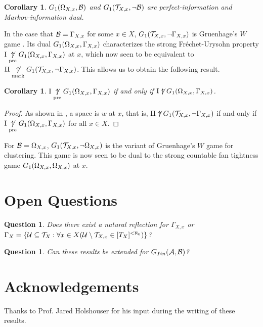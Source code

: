 \documentclass{amsart}
\theoremstyle{plain}
\newtheorem{corollary}[theorem]{Corollary}
\newtheorem{proposition}[theorem]{Proposition}
\newtheorem{question}[theorem]{Question}
\theoremstyle{definition}
\theoremstyle{remark}
\theoremstyle{plain}
\theoremstyle{definition}
\theoremstyle{remark}
\begin{document}
\begin{corollary}
  \(G_{1}(\Omega_{X,x},\mathcal{B})\) and \(G_{1}(\mathcal{T}_{X,x},\neg\mathcal{B})\) are perfect-information
  and Markov-information dual.
\end{corollary}

In the case that \(\mathcal{B}=\Gamma_{X,x}\) for some \(x\in X\), \(G_{1}(\mathcal{T}_{X,x},\neg\Gamma_{X,x})\)
is Gruenhage's \(W\) game \cite{MR0413049}. Its dual \(G_{1}(\Omega_{X,x},\Gamma_{X,x})\) characterizes
the strong Fr\'echet-Urysohn property \(\mathrm{I}\underset{\text{pre}}{\not\uparrow}G_{1}(\Omega_{X,x},\Gamma_{X,x})\) at \(x\),
which now seen to be equivalent to \(\mathrm{II}\underset{\text{mark}}{\not\uparrow}G_{1}(\mathcal{T}_{X,x},\neg\Gamma_{X,x})\).
This allows us to obtain the following result.

\begin{corollary}
  \(\mathrm{I}\underset{\text{pre}}{\not\uparrow}G_{1}(\Omega_{X,x},\Gamma_{X,x})\)
  if and only if
  \(\mathrm{I}\not\uparrow G_{1}(\Omega_{X,x},\Gamma_{X,x})\).
\end{corollary} 
\begin{proof}
  As shown in \cite{MR510910},
  a space is \(w\) at \(x\), that is, \(\mathrm{II}\not\uparrow G_{1}(\mathcal{T}_{X,x},\neg\Gamma_{X,x})\) 
  if and only if \(\mathrm{I}\underset{\text{pre}}{\not\uparrow}G_{1}(\Omega_{X,x},\Gamma_{X,x})\) for all \(x\in X\).
\end{proof}

For \(\mathcal{B}=\Omega_{X,x}\), \(G_{1}(\mathcal{T}_{X,x},\neg\Omega_{X,x})\) is the variant of
Gruenhage's \(W\) game for clustering. This game is now seen to be dual to the strong countable fan tightness game
\(G_{1}(\Omega_{X,x},\Omega_{X,x})\) at \(x\).

%
%  

\section{Open Questions}

\begin{question}
  Does there exist a natural reflection for \(\Gamma_{X,x}\)
  or \(\Gamma_X=\{\mathcal{U}\subseteq\mathcal{T}_X:\forall x\in X(\mathcal{U}\setminus\mathcal{T}_{X,x}\in[T_X]^{<\aleph_0})\}\)?
\end{question} 

\begin{question}
  Can these results be extended for \(G_{fin}(\mathcal{A},\mathcal{B})\)?
\end{question}

\section{Acknowledgements}

Thanks to Prof. Jared Holshouser for his input during the writing of these results.



\end{document}
